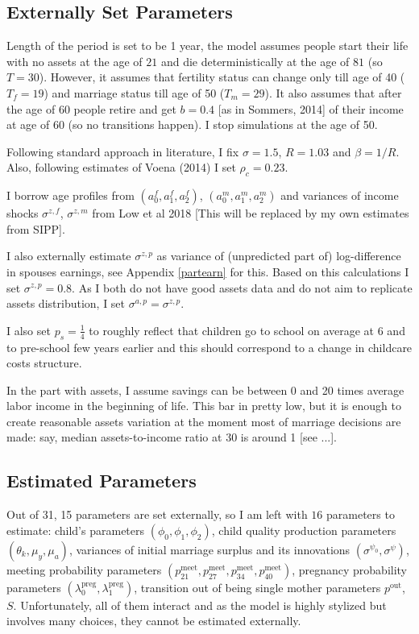 \documentclass[12pt,letter]{article}
\begin{document}
\subsection{Externally Set Parameters}
Length of the period is set to be 1 year, the model assumes people start their life with no assets at the age of $21$ and die deterministically at the age of $81$ (so $T = 30$). However, it assumes that fertility status can change only till age of 40 ($T_f = 19$) and marriage status till age of 50 ($T_m = 29$). It also assumes that after the age of 60 people retire and get $b = 0.4$ [as in Sommers, 2014] of their income at age of 60 (so no transitions happen). I stop simulations at the age of 50. 

Following standard approach in literature, I fix $\sigma = 1.5$, $R = 1.03$ and $\beta = 1/R$. Also, following estimates of Voena (2014) I set $\rho_c = 0.23$. 

I borrow age profiles from $(a^f_0,a^f_1,a^f_2)$, $(a^m_0,a^m_1,a^m_2)$ and variances of income shocks $\sigma^{z,f}$, $\sigma^{z,m}$ from Low et al 2018 [This will be replaced by my own estimates from SIPP].

I also externally estimate $\sigma^{z,p}$ as variance of (unpredicted part of) log-difference in spouses earnings, see Appendix \ref{partearn} for this. Based on this calculations I set $\sigma^{z,p} = 0.8$. As I both do not have good assets data and do not aim to replicate assets distribution, I set $\sigma^{a,p} = \sigma^{z,p}$.

I also set $p_s = \frac14$ to roughly reflect that children go to school on average at 6 and to pre-school few years earlier and this should correspond to a change in childcare costs structure.

In the part with assets, I assume savings can be between 0 and 20 times average labor income in the beginning of life. This bar in pretty low, but it is enough to create reasonable assets variation at the moment most of marriage decisions are made: say, median assets-to-income ratio at 30 is around 1 [see ...]. 

\subsection{Estimated Parameters}
Out of 31, 15 parameters are set externally, so I am left with $16$ parameters to estimate: child's parameters $(\phi_0,\phi_1,\phi_2)$, child quality production parameters $(\theta_k,\mu_y,\mu_a)$, variances of initial marriage surplus and its innovations $(\sigma^{\psi_0},\sigma^{\psi})$, meeting probability parameters $(p^{\text{meet}}_{21},p^{\text{meet}}_{27},p^{\text{meet}}_{34},p^{\text{meet}}_{40})$, pregnancy probability parameters $(\lambda^{\text{preg}}_0,\lambda^{\text{preg}}_1)$, transition out of being single mother parameters $p^{\text{out}}$, $S$. Unfortunately, all of them interact and as the model is highly stylized but involves many choices, they cannot be estimated externally. 
\end{document}
